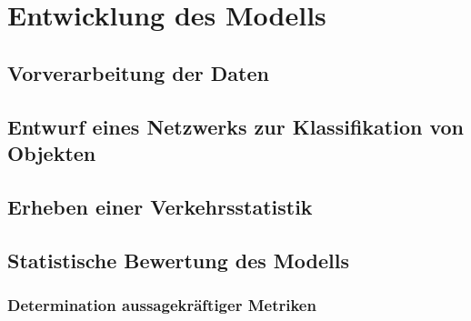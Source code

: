 \chapter{Entwicklung des Modells}

\section{Vorverarbeitung der Daten}

\section{Entwurf eines Netzwerks zur Klassifikation von Objekten}

\section{}

\section{Erheben einer Verkehrsstatistik}

\section{Statistische Bewertung des Modells}

\subsection{Determination aussagekräftiger Metriken}
